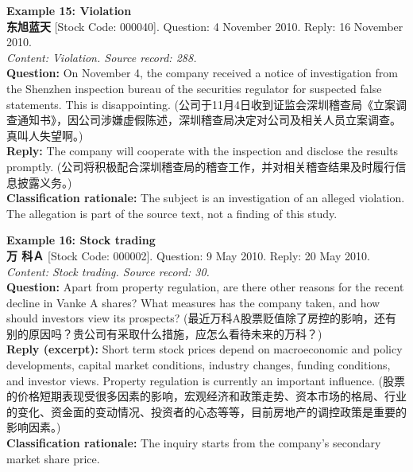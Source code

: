 \vspace{0.4cm}
\noindent \textbf{Example 15: Violation} \\
\textbf{东旭蓝天} [Stock Code: 000040]. Question: 4 November 2010. Reply: 16 November 2010. \\
\textit{Content: Violation. Source record: 288.} \\
\textbf{Question:} On November 4, the company received a notice of investigation from the Shenzhen inspection bureau of the securities regulator for suspected false statements. This is disappointing. (公司于11月4日收到证监会深圳稽查局《立案调查通知书》，因公司涉嫌虚假陈述，深圳稽查局决定对公司及相关人员立案调查。 真叫人失望啊。) \\
\textbf{Reply:} The company will cooperate with the inspection and disclose the results promptly. (公司将积极配合深圳稽查局的稽查工作，并对相关稽查结果及时履行信息披露义务。) \\
\textbf{Classification rationale:} The subject is an investigation of an alleged violation. The allegation is part of the source text, not a finding of this study.

\clearpage
\noindent \textbf{Example 16: Stock trading} \\
\textbf{万 科Ａ} [Stock Code: 000002]. Question: 9 May 2010. Reply: 20 May 2010. \\
\textit{Content: Stock trading. Source record: 30.} \\
\textbf{Question:} Apart from property regulation, are there other reasons for the recent decline in Vanke A shares? What measures has the company taken, and how should investors view its prospects? (最近万科A股票贬值除了房控的影响，还有别的原因吗？贵公司有采取什么措施，应怎么看待未来的万科？) \\
\textbf{Reply (excerpt):} Short term stock prices depend on macroeconomic and policy developments, capital market conditions, industry changes, funding conditions, and investor views. Property regulation is currently an important influence. (股票的价格短期表现受很多因素的影响，宏观经济和政策走势、资本市场的格局、行业的变化、资金面的变动情况、投资者的心态等等，目前房地产的调控政策是重要的影响因素。) \\
\textbf{Classification rationale:} The inquiry starts from the company's secondary market share price.

